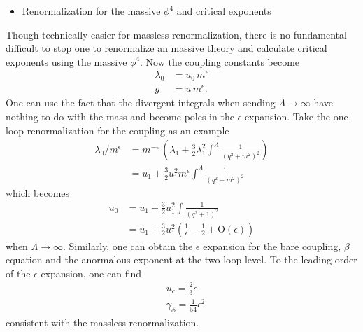 \documentclass[submission, PhysLectNotes]{SciPost}
\begin{document}
\begin{itemize}
	\item Renormalization for the massive $\phi^4$ and critical exponents
\end{itemize}
Though technically easier for massless renormalization, there is no fundamental difficult to stop one to renormalize an massive theory and calculate critical exponents using the massive $\phi^4$. Now the coupling constants become
\begin{equation}
	\begin{aligned}
		\lambda_0 &= u_0 \, m^\epsilon \\
		g &= u \, m^\epsilon.
	\end{aligned}
\end{equation}
One can use the fact that the divergent integrals when sending $\Lambda \rightarrow \infty$ have nothing to do with the mass and become poles in the $\epsilon$ expansion. Take the one-loop renormalization for the coupling as an example
\begin{equation}
	\begin{aligned}
		\lambda_0 / m^\epsilon &= m^{-\epsilon}\, \left( \lambda_1 + \frac{3}{2} \lambda_1^2 \int^\Lambda \frac{1}{\left(q^2 + m^2\right)^2} \right) \\
		&= u_1 + \frac{3}{2}u_1^2 m^\epsilon \int^\Lambda \frac{1}{\left(q^2 + m^2\right)^2}
	\end{aligned}
\end{equation}
which becomes 
\begin{equation}
	\begin{aligned}
		u_0& = u_1 + \frac{3}{2} u_1^2 \int \frac{1}{\left(q^2 + 1\right)^2} \\
		& = u_1 + \frac{3}{2} u_1^2 \left(\frac{1}{\epsilon} -\frac{1}{2} + \mathrm{O}(\epsilon)\right)
	\end{aligned}
\end{equation}
when $\Lambda \rightarrow \infty$. Similarly, one can obtain the $\epsilon$ expansion for the bare coupling, $\beta$ equation and the anormalous exponent at the two-loop level. To the leading order of the $\epsilon$ expansion, one can find 
\begin{equation}
	\begin{aligned}
		&u_c = \frac{2}{3}\epsilon \\
		&\gamma_\phi = \frac{1}{54}\epsilon^2
	\end{aligned}
\end{equation}
consistent with the massless renormalization.
\end{document}
